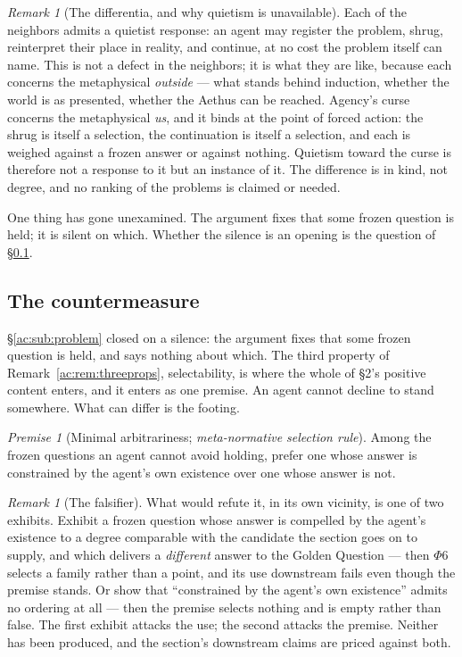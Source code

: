 \documentclass[11pt]{article}
\numberwithin{equation}{section}
\theoremstyle{plain}
\theoremstyle{definition}
\theoremstyle{remark}
\newtheorem{remark}[theorem]{Remark}
\newtheorem{premise}{Premise}
\begin{document}
\begin{remark}[The differentia, and why quietism is unavailable]\label{ac:rem:differentia}
Each of the neighbors admits a quietist response: an agent may register the problem, shrug, reinterpret their place in reality, and continue, at no cost the problem itself can name. This is not a defect in the neighbors; it is what they are like, because each concerns the metaphysical \emph{outside} --- what stands behind induction, whether the world is as presented, whether the Aethus can be reached. Agency's curse concerns the metaphysical \emph{us}, and it binds at the point of forced action: the shrug is itself a selection, the continuation is itself a selection, and each is weighed against a frozen answer or against nothing. Quietism toward the curse is therefore not a response to it but an instance of it. The difference is in kind, not degree, and no ranking of the problems is claimed or needed.
\end{remark}

One thing has gone unexamined. The argument fixes that some frozen question is held; it is silent on which. Whether the silence is an opening is the question of \S\ref{ac:sub:countermeasure}.

\subsection{The countermeasure}\label{ac:sub:countermeasure}

\S\ref{ac:sub:problem} closed on a silence: the argument fixes that some frozen question is held, and says nothing about which. The third property of Remark~\ref{ac:rem:threeprops}, selectability, is where the whole of \S2's positive content enters, and it enters as one premise. An agent cannot decline to stand somewhere. What can differ is the footing.

\setcounter{premise}{5} %
\begin{premise}[Minimal arbitrariness; \emph{meta-normative selection rule}]\label{ac:phi6}
Among the frozen questions an agent cannot avoid holding, prefer one whose answer is constrained by the agent's own existence over one whose answer is not.
\end{premise}

\begin{remark}[The falsifier]\label{ac:rem:phi6falsifier}
What would refute it, in its own vicinity, is one of two exhibits. Exhibit a frozen question whose answer is compelled by the agent's existence to a degree comparable with the candidate the section goes on to supply, and which delivers a \emph{different} answer to the Golden Question --- then $\Phi6$ selects a family rather than a point, and its use downstream fails even though the premise stands. Or show that ``constrained by the agent's own existence'' admits no ordering at all --- then the premise selects nothing and is empty rather than false. The first exhibit attacks the use; the second attacks the premise. Neither has been produced, and the section's downstream claims are priced against both.
\end{remark}
\end{document}
